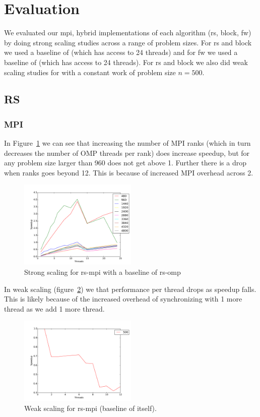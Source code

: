 \section{Evaluation}\label{sec:eval}

We evaluated our mpi, hybrid implementations of each algorithm (rs, block, fw) by doing strong scaling studies across a range of problem sizes. For rs and block we used a baseline of  (which has access to 24 threads) and for fw we used a baseline of  (which has access to 24 threads). For rs and block we also did weak scaling studies for with a constant work of problem size $n=500$.

\subsection{RS}

\subsubsection{MPI}

In Figure~\ref{strong-rs-mpi} we can see that increasing the number of MPI ranks (which in turn decreases the number of OMP threads per rank) does increase speedup, but for any problem size larger than 960 does not get above 1. Further there is a drop when ranks goes beyond 12. This is because of increased MPI overhead across 2.

\begin{figure}[ht]
\centering
\includegraphics[width=0.5\textwidth]{plots/strong_rs-mpi_baseline-rs-omp--1.pdf}
\caption{Strong scaling for rs-mpi with a baseline of rs-omp}
\label{strong-rs-mpi}
\end{figure}

In weak scaling (figure~\ref{weak-rs-mpi}) we that performance per thread drops as speedup falls. This is likely because of the increased overhead of synchronizing with 1 more thread as we add 1 more thread.

\begin{figure}[ht]
\centering
\includegraphics[width=0.5\textwidth]{plots/weak_rs-mpi.pdf}
\caption{Weak scaling for rs-mpi (baseline of itself).}
\label{weak-rs-mpi}
\end{figure}

